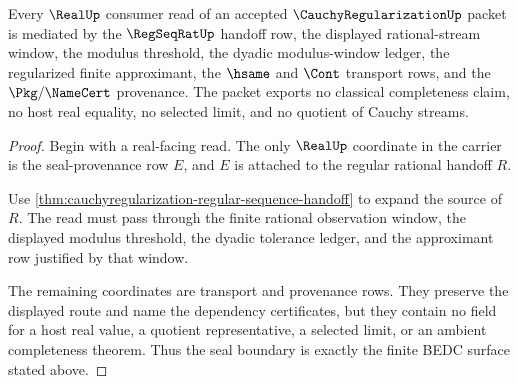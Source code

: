 \begin{theorem}
\label{thm:cauchyregularization-real-seal-boundary}
Every $\RealUp$ consumer read of an accepted $\CauchyRegularizationUp$ packet
is mediated by the $\RegSeqRatUp$ handoff row, the displayed rational-stream
window, the modulus threshold, the dyadic modulus-window ledger, the
regularized finite approximant, the $\hsame$ and $\Cont$ transport rows, and
the $\Pkg/\NameCert$ provenance. The packet exports no classical
completeness claim, no host real equality, no selected limit, and no quotient
of Cauchy streams.
\end{theorem}
\begin{proof}
Begin with a real-facing read. The only $\RealUp$ coordinate in the carrier is
the seal-provenance row $E$, and $E$ is attached to the regular rational
handoff $R$.

Use \autoref{thm:cauchyregularization-regular-sequence-handoff} to expand the
source of $R$. The read must pass through the finite rational observation
window, the displayed modulus threshold, the dyadic tolerance ledger, and the
approximant row justified by that window.

The remaining coordinates are transport and provenance rows. They preserve
the displayed route and name the dependency certificates, but they contain no
field for a host real value, a quotient representative, a selected limit, or
an ambient completeness theorem. Thus the seal boundary is exactly the
finite BEDC surface stated above.
\end{proof}

